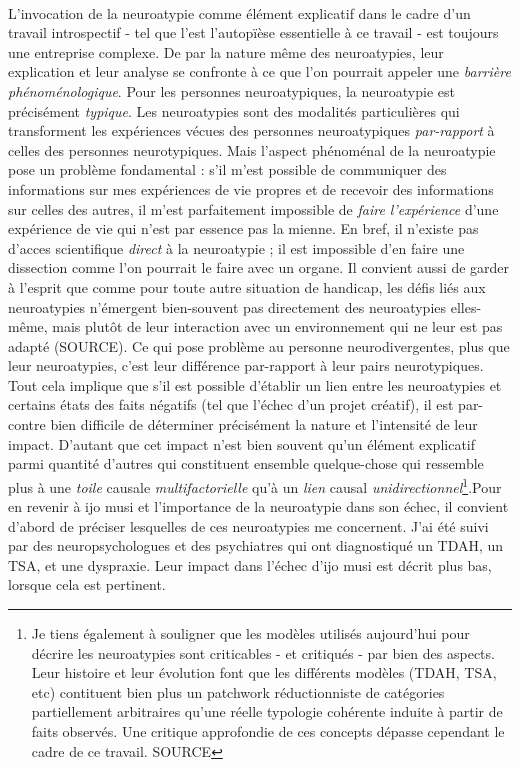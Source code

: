 \documentclass{scrartcl}
\let\emph\relax %
\begin{document}
	\emph{Neuroatypies}\\
	L'invocation de la neuroatypie comme élément explicatif dans le cadre d'un travail introspectif - tel que l'est l'autopïèse essentielle à ce travail - est toujours une entreprise complexe. De par la nature même des neuroatypies, leur explication et leur analyse se confronte à ce que l'on pourrait appeler une \textit{barrière phénoménologique}. Pour les personnes neuroatypiques, la neuroatypie est précisément \textit{typique}. Les neuroatypies sont des modalités particulières qui transforment les expériences vécues des personnes neuroatypiques \textit{par-rapport} à celles des personnes neurotypiques. Mais l'aspect phénoménal de la neuroatypie pose un problème fondamental : s'il m'est possible de communiquer des informations sur mes expériences de vie propres et de recevoir des informations sur celles des autres, il m'est parfaitement impossible de \textit{faire l'expérience} d'une expérience de vie qui n'est par essence pas la mienne. En bref, il n'existe pas d'acces scientifique \textit{direct} à la neuroatypie ; il est impossible d'en faire une dissection comme l'on pourrait le faire avec un organe. Il convient aussi de garder à l'esprit que comme pour toute autre situation de handicap, les défis liés aux neuroatypies n'émergent bien-souvent pas directement des neuroatypies elles-même, mais plutôt de leur interaction avec un environnement qui ne leur est pas adapté (SOURCE). Ce qui pose problème au personne neurodivergentes, plus que leur neuroatypies, c'est leur différence par-rapport à leur pairs neurotypiques. Tout cela implique que s'il est possible d'établir un lien entre les neuroatypies et certains états des faits négatifs (tel que l'échec d'un projet créatif), il est par-contre bien difficile de déterminer précisément la nature et l'intensité de leur impact. D'autant que cet impact n'est bien souvent qu'un élément explicatif parmi quantité d'autres qui constituent ensemble quelque-chose qui ressemble plus à une \textit{toile} causale \textit{multifactorielle} qu'à un \textit{lien} causal \textit{unidirectionnel}\footnote{Je tiens également à souligner que les modèles utilisés aujourd'hui pour décrire les neuroatypies sont criticables - et critiqués - par bien des aspects. Leur histoire et leur évolution font que les différents modèles (TDAH, TSA, etc) contituent bien plus un patchwork réductionniste de catégories partiellement arbitraires qu'une réelle typologie cohérente induite à partir de faits observés. Une critique approfondie de ces concepts dépasse cependant le cadre de ce travail. SOURCE}.Pour en revenir à ijo musi et l'importance de la neuroatypie dans son échec, il convient d'abord de préciser lesquelles de ces neuroatypies me concernent. J'ai été suivi par des neuropsychologues et des psychiatres qui ont diagnostiqué un TDAH, un TSA, et une dyspraxie. Leur impact dans l'échec d'ijo musi est décrit plus bas, lorsque cela est pertinent.\\
	
\end{document}

